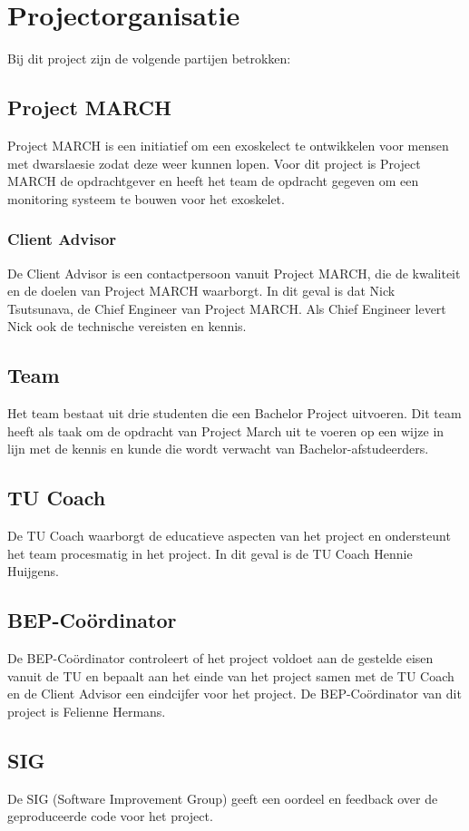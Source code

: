 \section{Projectorganisatie}
Bij dit project zijn de volgende partijen betrokken:

\subsection{Project MARCH}
Project MARCH is een initiatief om een exoskelect te ontwikkelen voor mensen met dwarslaesie zodat deze weer kunnen lopen. Voor dit project is Project MARCH de opdrachtgever en heeft het team de opdracht gegeven om een monitoring systeem te bouwen voor het exoskelet.

\subsubsection{Client Advisor}
De Client Advisor is een contactpersoon vanuit Project MARCH, die de kwaliteit en de doelen van Project MARCH waarborgt. In dit geval is dat Nick Tsutsunava, de Chief Engineer van Project MARCH. Als Chief Engineer levert Nick ook de technische vereisten en kennis.

\subsection{Team}
Het team bestaat uit drie studenten die een Bachelor Project uitvoeren. Dit team heeft als taak om de opdracht van Project March uit te voeren op een wijze in lijn met de kennis en kunde die wordt verwacht van Bachelor-afstudeerders.

\subsection{TU Coach}
De TU Coach waarborgt de educatieve aspecten van het project en ondersteunt het team procesmatig in het project. In dit geval is de TU Coach Hennie Huijgens. 

\subsection{BEP-Coördinator}
De BEP-Coördinator controleert of het project voldoet aan de gestelde eisen vanuit de TU en bepaalt aan het einde van het project samen met de TU Coach en de Client Advisor een eindcijfer voor het project. De BEP-Coördinator van dit project is Felienne Hermans. 

\subsection{SIG}
De SIG (Software Improvement Group) geeft een oordeel en feedback over de geproduceerde code voor het project. 

